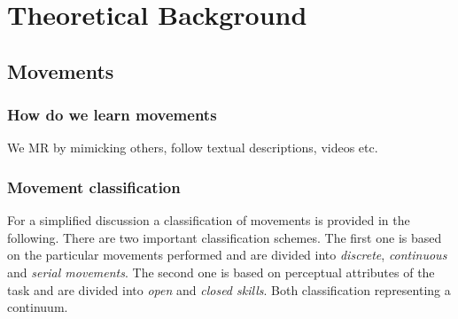 \chapter{Theoretical Background}

\section{Movements}
\subsection{How do we learn movements}
We MR by mimicking others, follow textual descriptions, videos etc. \todo 

\subsection{Movement classification}
For a simplified discussion a classification of movements is provided in the following. There are two important classification schemes. The first one is based on the particular movements performed and are divided into \textit{discrete}, \textit{continuous} and \textit{serial movements}. The second one is based on perceptual attributes of the task and are divided into \textit{open} and \textit{closed skills}. Both classification representing a continuum.

